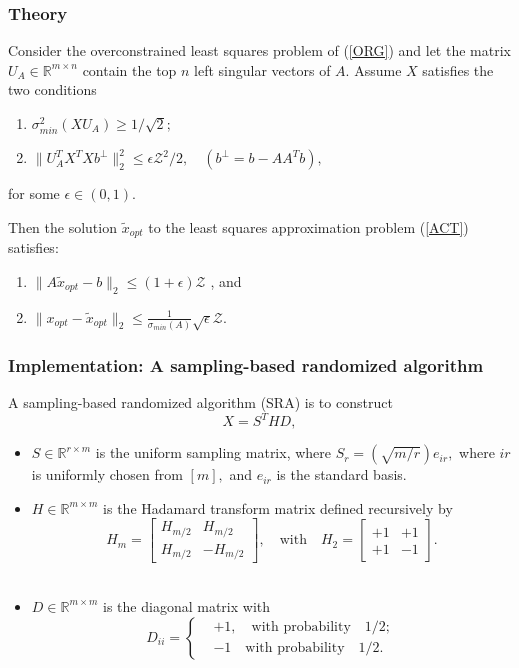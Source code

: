 \subsubsection{Theory}
\begin{lemma}
Consider the overconstrained least squares problem of (\ref{ORG}) and let the matrix $U_A \in \mathbb{R}^{m\times n}$ contain the top $n$ left singular vectors of $A$. Assume $X$ satisfies the two conditions
\begin{enumerate}
\item $\sigma_{min}^2(X U_A) \geq 1/\sqrt{2}; $ \\
\item $\| U_A^T X^T X b^{\perp}\|_2^2 \leq \epsilon \mathcal{Z}^2 /2, \quad (b^{\perp} = b - A A^T b), $
\end{enumerate}
for some $\epsilon \in (0,1).$

Then the solution $\tilde{x}_{opt}$ to the least squares approximation problem (\ref{ACT}) satisfies:
\begin{enumerate}
\item $\| A \tilde{x}_{opt} - b\|_2 \leq (1+ \epsilon) \mathcal{Z} $ , and \\
\item $\| x_{opt} - \tilde{x}_{opt} \|_2 \leq \frac{1}{\sigma_{min}(A)} \sqrt{\epsilon} \mathcal{Z}. $
\end{enumerate}
\end{lemma}

\subsubsection{Implementation: A sampling-based randomized algorithm}
A sampling-based randomized algorithm (SRA) is to construct
$$
X = S^T H D,
$$

\begin{itemize}
\item $S \in \mathbb{R}^{r \times m}$ is the uniform sampling matrix, where $S_{r} = (\sqrt{m/r}) e_{ir},$ where $ir$ is uniformly chosen from $[m],$
and $e_{ir}$ is the standard basis. \\
\item $H \in \mathbb{R}^{m \times m}$ is the Hadamard transform matrix defined recursively by
$$
H_m = \begin{bmatrix} H_{m/2} & H_{m/2} \\ H_{m/2} & -H_{m/2} \end{bmatrix}, \quad \text{with} \quad H_2 = \begin{bmatrix} +1 & +1 \\ +1 & -1 \end{bmatrix}.
$$\\
\item $D \in \mathbb{R}^{m \times m}$ is the diagonal matrix with
$$
D_{ii} = \begin{cases} &+1, \quad \text{with probability} \quad 1/2;\\ &-1 \quad \text{with probability} \quad 1/2. \end{cases}
$$
\end{itemize}

